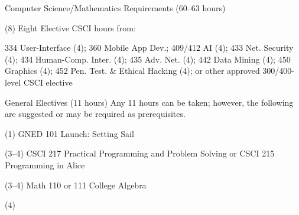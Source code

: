 \begin{reqgroup}{Computer Science/Mathematics Requirements (60--63 hours)}
\begin{checklist}
\begin{minipage}[t]{0.5\linewidth}
	\item (8) Eight Elective CSCI hours from:
	\item \phantom{(8)} \begin{minipage}[t]{\dimexpr\linewidth-1em\relax}\raggedright{}334 User-Interface (4); 360 Mobile App Dev.; 409/412 AI (4); 433 Net. Security (4); 434 Human-Comp. Inter. (4); 435 Adv. Net. (4); 442 Data Mining (4); 450 Graphics (4); 452 Pen. Test. \& Ethical Hacking (4); or other approved 300/400-level CSCI elective\end{minipage}


\end{minipage}
\end{checklist}
\end{reqgroup}

\begin{reqgroup}{General Electives (11 hours)}
Any 11 hours can be taken; however, the following are suggested or may be required as prerequisites.
\begin{checklist}
\begin{minipage}[t]{\linewidth}
	\item (1)	GNED 101	Launch: Setting Sail
	\item (3--4)	CSCI 217	Practical Programming and Problem Solving or CSCI 215	Programming in Alice
	\item (3--4) Math 110 or 111 College Algebra
	\item (4) 
\end{minipage}
\end{checklist}
\end{reqgroup}


